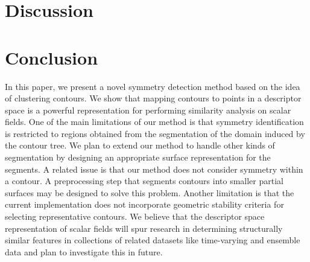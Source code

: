 \documentclass[review,journal]{vgtc}         %
\begin{document}
\section{Discussion}
\section{Conclusion}
In this paper, we present a novel symmetry detection method based on the idea of clustering contours.
We show that mapping contours to points in a descriptor space is a powerful representation for
performing similarity analysis on scalar fields. One of the main limitations of our method is that
symmetry identification is restricted to regions obtained from the segmentation of the domain induced
by the contour tree. We plan to extend our method to handle other kinds of segmentation by designing
an appropriate surface representation for the segments. A related issue is that our method does not 
consider symmetry within a contour. A preprocessing step that segments contours into smaller partial
surfaces may be designed to solve this problem. Another limitation is that the current implementation
does not incorporate geometric stability criteria for selecting representative contours. We believe
that the descriptor space representation of scalar fields will spur research in determining structurally
similar features in collections of related datasets like time-varying and ensemble data and plan to 
investigate this in future.
%
%
%
%
%
\end{document}
